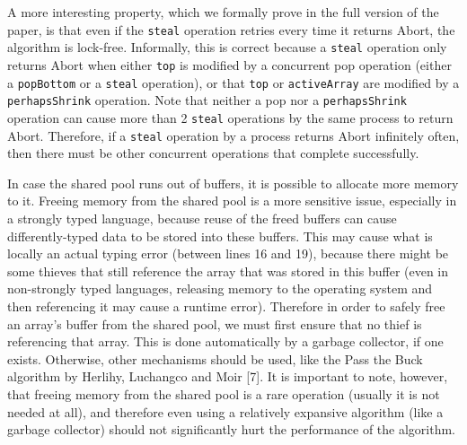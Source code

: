 A more interesting property, which we formally prove in the full
version of the paper, is that even if the \lstinline!steal! operation
retries every time it returns Abort, the algorithm is
lock-free. Informally, this is correct because a \lstinline!steal!
operation only returns Abort when either \lstinline!top! is modified
by a concurrent pop operation (either a \lstinline!popBottom! or a
\lstinline!steal! operation), or that \lstinline!top! or
\lstinline!activeArray! are modified by a \lstinline!perhapsShrink!
operation. Note that neither a pop nor a \lstinline!perhapsShrink!
operation can cause more than 2 \lstinline!steal! operations by the
same process to return Abort. Therefore, if a \lstinline!steal!
operation by a process returns Abort infinitely often, then there must
be other concurrent operations that complete successfully.


In case the shared pool runs out of buffers, it is possible to
allocate more memory to it. Freeing memory from the shared pool is a
more sensitive issue, especially in a strongly typed language, because
reuse of the freed buffers can cause differently-typed data to be
stored into these buffers. This may cause what is locally an actual
typing error (between lines 16 and 19), because there might be some
thieves that still reference the array that was stored in this buffer
(even in non-strongly typed languages, releasing memory to the
operating system and then referencing it may cause a runtime
error). Therefore in order to safely free an array's buffer from the
shared pool, we must first ensure that no thief is referencing that
array. This is done automatically by a garbage collector, if one
exists. Otherwise, other mechanisms should be used, like the Pass the
Buck algorithm by Herlihy, Luchangco and Moir [7]. It is important to
note, however, that freeing memory from the shared pool is a rare
operation (usually it is not needed at all), and therefore even using
a relatively expansive algorithm (like a garbage collector) should not
significantly hurt the performance of the algorithm.


